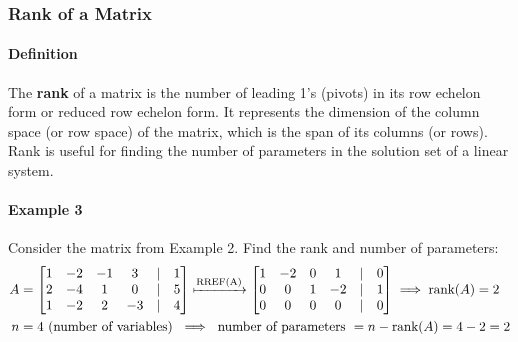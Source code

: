 \hrulefill 

\subsubsection*{Rank of a Matrix}
\paragraph*{Definition} The \textbf{rank} of a matrix is the number of leading 1's (pivots) in its row echelon form or reduced row echelon form.
It represents the dimension of the column space (or row space) of the matrix, which is the span of its columns (or rows). Rank is useful 
for finding the number of parameters in the solution set of a linear system. 

\paragraph*{Example 3} Consider the matrix from Example 2. Find the rank and number of parameters:
\begin{align*}
    A &= \begin{bmatrix}
        1 & -2 & -1 & 3 & | & 1 \\
        2 & -4 & 1 & 0 & | & 5 \\
        1 & -2 & 2 & -3 & | & 4 \\
    \end{bmatrix} \xmapsto{\text{RREF(A)}} \begin{bmatrix}
        1 & -2 & 0 & 1 & | & 0 \\
        0 & 0 & 1 & -2 & | & 1 \\
        0 & 0 & 0 & 0 & | & 0 \\
    \end{bmatrix} \implies \text{rank}(A) = 2 \\
    n &= 4 \text{ (number of variables) } \implies \text{ number of parameters } = n - \text{rank}(A) = 4 - 2 = 2
\end{align*}

